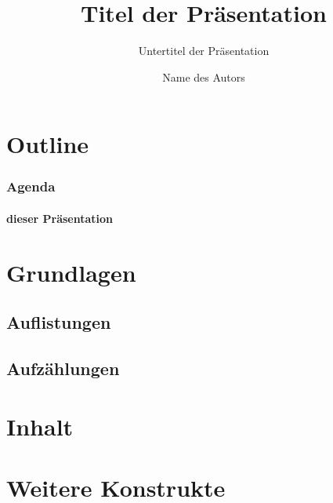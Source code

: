 \documentclass[t]{beamer}
\author{Name des Autors}
\title{Titel der Pr\"asentation}
\subtitle{Untertitel der Pr\"asentation}
\begin{document}
    

    \section*{Outline}
    \begin{frame}
        \frametitle{Agenda}
        \framesubtitle{dieser Pr\"asentation}
        \tableofcontents
    \end{frame}

    \section{Grundlagen}

    \subsection{Auflistungen}

    

    \subsection{Aufz\"ahlungen}

    

    \section{Inhalt}

    

    \section{Weitere Konstrukte}

    

    

    
\end{document}
